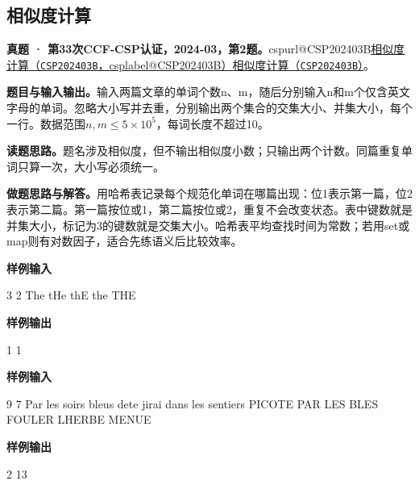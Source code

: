 \documentclass[UTF8,11pt,a4paper,fontset=none]{ctexart}
\makeatletter
\newcommand{\csp}[2]{\ifcsname cspurl@#1\endcsname\href{\csname cspurl@#1\endcsname}{#2（\texttt{#1}，\csname csplabel@#1\endcsname）}\else\href{https://oj.shumeng.tech/p/#1}{#2（\texttt{#1}）}\fi}
\makeatother
\begin{document}
\subsection{相似度计算}
\textbf{真题 · 第33次CCF-CSP认证，2024-03，第2题。}\csp{CSP202403B}{相似度计算}。

\noindent\textbf{题目与输入输出。}输入两篇文章的单词个数n、m，随后分别输入n和m个仅含英文字母的单词。忽略大小写并去重，分别输出两个集合的交集大小、并集大小，每个一行。数据范围$n,m\le5\times10^5$，每词长度不超过10。

\noindent\textbf{读题思路。}题名涉及相似度，但不输出相似度小数；只输出两个计数。同篇重复单词只算一次，大小写必须统一。

\noindent\textbf{做题思路与解答。}用哈希表记录每个规范化单词在哪篇出现：位1表示第一篇，位2表示第二篇。第一篇按位或1，第二篇按位或2，重复不会改变状态。表中键数就是并集大小，标记为3的键数就是交集大小。哈希表平均查找时间为常数；若用set或map则有对数因子，适合先练语义后比较效率。
\begin{tcolorbox}[samplebox,title={输入输出样例}]
\textbf{样例输入}
\begin{Sample}
3 2
The tHe thE
the THE
\end{Sample}
\tcblower
\textbf{样例输出}
\begin{Sample}
1
1
\end{Sample}
\end{tcolorbox}
\begin{tcolorbox}[samplebox,title={输入输出样例}]
\textbf{样例输入}
\begin{Sample}
9 7
Par les soirs bleus dete jirai dans les sentiers
PICOTE PAR LES BLES FOULER LHERBE MENUE
\end{Sample}
\tcblower
\textbf{样例输出}
\begin{Sample}
2
13
\end{Sample}
\end{tcolorbox}
\end{document}
